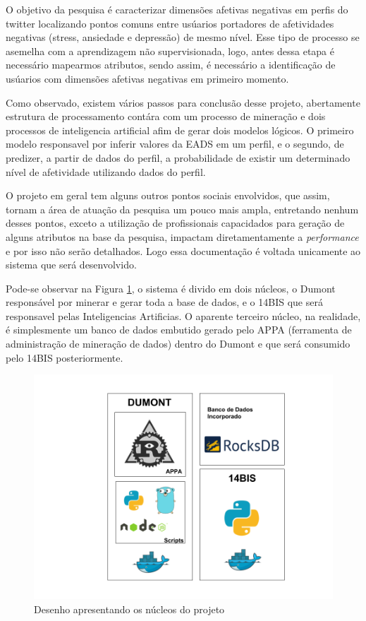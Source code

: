 O objetivo da pesquisa é caracterizar dimensões afetivas negativas em perfis do twitter localizando pontos comuns entre usúarios portadores de afetividades negativas (stress, ansiedade e depressão) de mesmo nível. Esse tipo de processo se asemelha com a aprendizagem não supervisionada, logo, antes dessa etapa é necessário mapearmos atributos, sendo assim, é necessário a identificação de usúarios com dimensões afetivas negativas em primeiro momento.

Como observado, existem vários passos para conclusão desse projeto, abertamente estrutura de processamento contára com um processo de mineração e dois processos de inteligencia artificial afim de gerar dois modelos lógicos. O primeiro modelo responsavel por inferir valores da EADS em um perfil, e o segundo, de predizer, a partir de dados do perfil, a probabilidade de existir um determinado nível de afetividade utilizando dados do perfil.

O projeto em geral tem alguns outros pontos sociais envolvidos, que assim, tornam a área de atuação da pesquisa um pouco mais ampla, entretando nenhum desses pontos, exceto a utilização de profissionais capacidados para geração de alguns atributos na base da pesquisa, impactam diretamentamente a \textit{performance} e por isso não serão detalhados. Logo essa documentação é voltada unicamente ao sistema que será desenvolvido.

Pode-se observar na Figura \ref{fig:tecnologias}, o sistema é divido em dois núcleos, o Dumont responsável por minerar e gerar toda a base de dados, e o 14BIS que será responsavel pelas Inteligencias Artificias. O aparente terceiro núcleo, na realidade, é simplesmente um banco de dados embutido gerado pelo APPA (ferramenta de administração de mineração de dados) dentro do Dumont e que será consumido pelo 14BIS posteriormente.

\begin{figure}
    \centering
    \includegraphics[width=.8\textwidth]{imagens/tecnologias.png}
    \caption{Desenho apresentando os núcleos do projeto}
    \label{fig:tecnologias}
\end{figure}

